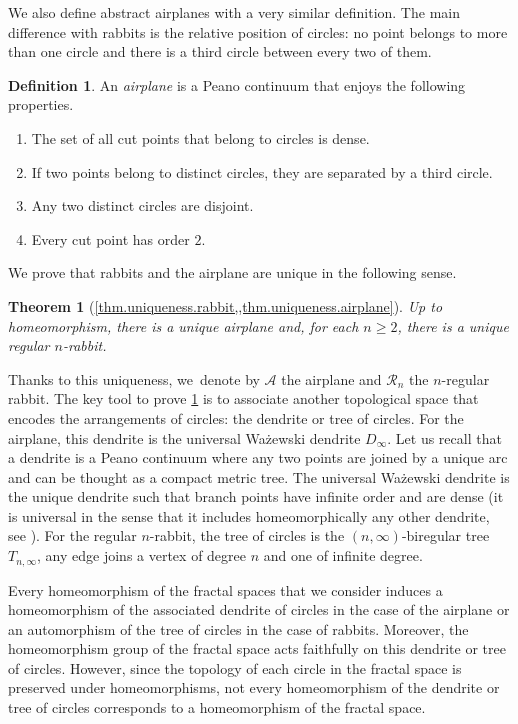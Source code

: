 \documentclass[JEP,XML,SOM,Unicode,NoFloatCountersInSection,published]{cedram}
\theoremstyle{plain}
\newtheorem{introtheorem}{Theorem}
\theoremstyle{definition}
\newtheorem{introdefinition}{Definition}
\theoremstyle{remark}
\newcommand{\A}{\mathcal{A}}
\newcommand{\R}{\mathcal{R}}
\begin{document}
We also define abstract airplanes with a very similar definition.
The main difference with rabbits is the relative position of circles:
no point belongs to more than one circle and there is a third circle between every two of them.

\begin{introdefinition}
\label{def.airplane}
An \emph{airplane} is a Peano continuum that enjoys the following properties.
\begin{enumerate}
\item\label{def.airplane1} The set of all cut points that belong to circles is dense.
\item\label{def.airplane2} If two points belong to distinct circles, they are separated by a third circle.
\item\label{def.airplane3} Any two distinct circles are disjoint.
\item\label{def.airplane4} Every cut point has order $2$.
\end{enumerate}
\end{introdefinition}

We prove that rabbits and the airplane are unique in the following sense.

\begin{introtheorem}[\cref{thm.uniqueness.rabbit,,thm.uniqueness.airplane}]
\label{thm.uniqueness.rabbits.and.airplane}
Up to homeomorphism, there is a unique airplane and, for each $n\geq2$, there is a unique regular $n$-rabbit.
\end{introtheorem}

Thanks to this uniqueness, we~denote by $\A$ the airplane and $\R_n$ the $n$-regular rabbit.
The key tool to prove \cref{thm.uniqueness.rabbits.and.airplane} is to associate another topological space that encodes the arrangements of circles: the dendrite or tree of circles.
For the airplane, this dendrite is the universal Ważewski dendrite $D_\infty$.
Let us recall that a dendrite is a Peano continuum where any two points are joined by a unique arc and can be thought as a compact metric tree.
The universal Ważewski dendrite is the unique dendrite such that branch points have infinite order and are dense (it is universal in the sense that it includes homeomorphically any other dendrite, see \cite{MR3532906}).
For the regular $n$-rabbit, the tree of circles is the $(n,\infty)$-biregular tree $T_{n,\infty}$, \ie any edge joins a vertex of degree $n$ and one of infinite degree.

Every homeomorphism of the fractal spaces that we consider induces a homeomorphism of the associated dendrite of circles in the case of the airplane or an automorphism of the tree of circles in the case of rabbits.
Moreover, the homeomorphism group of the fractal space acts faithfully on this dendrite or tree of circles.
However, since the topology of each circle in the fractal space is preserved under homeomorphisms, not every homeomorphism of the dendrite or tree of circles corresponds to a homeomorphism of the fractal space.\enlargethispage{\baselineskip}
\end{document}

